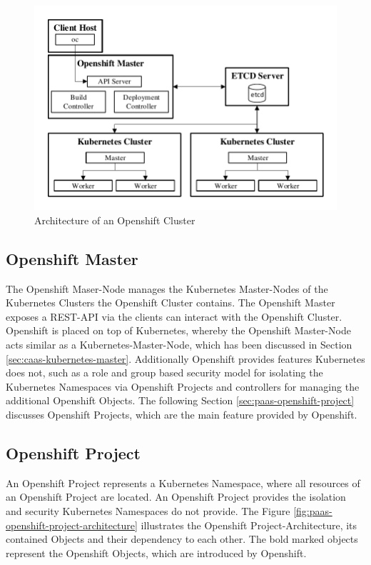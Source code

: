 \begin{figure}[htbp]
	\centering
	\includegraphics[scale=1]{images/openshift-kubernetes-cluster-architecture.pdf}
	\caption{Architecture of an Openshift Cluster}
	\label{fig:paas-openshift-kubernetes-cluster-architecture}
\end{figure} 

\subsection{Openshift Master}
\label{sec:paas-openshift-master}
The Openshift Maser-Node manages the Kubernetes Master-Nodes of the Kubernetes Clusters the Openshift Cluster contains. The Openshift Master exposes a REST-API via the clients can interact with the Openshift Cluster. Openshift is placed on top of Kubernetes, whereby the Openshift Master-Node acts similar as a Kubernetes-Master-Node, which has been discussed in Section \vref{sec:caas-kubernetes-master}. Additionally Openshift provides features Kubernetes does not, such as a role and group based security model for isolating the Kubernetes Namespaces via Openshift Projects and controllers for managing the additional Openshift Objects. The following Section \vref{sec:paas-openshift-project} discusses Openshift Projects, which are the main feature provided by Openshift.

\subsection{Openshift Project}
\label{sec:paas-openshift-project}
An Openshift Project represents a Kubernetes Namespace, where all resources of an Openshift Project are located. An Openshift Project provides the isolation and security Kubernetes Namespaces do not provide. The Figure \vref{fig:paas-openshift-project-architecture} illustrates the Openshift Project-Architecture, its contained Objects and their dependency to each other. The bold marked objects represent the Openshift Objects, which are introduced by Openshift.
\newpage


